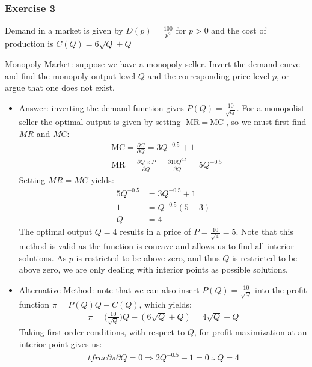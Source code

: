 \documentclass{article}
\begin{document}
\subsubsection{Exercise 3}
Demand in a market is given by $D(p) = \tfrac{100}{p^{2}}$ for $p > 0$ and the cost of production is $C(Q) = 6 \sqrt{Q} + Q$ \par \vspace{0.3em}
  \underline{Monopoly Market}: suppose we have a monopoly seller. Invert the demand curve and find the monopoly output level $Q$ and the corresponding price level $p$, or argue that one does not exist.
  \begin{itemize}
    \item  \underline{Answer}: inverting the demand function gives $P(Q) = \tfrac{10}{\sqrt{Q}}$. For a monopolist seller the optimal output is given by setting $\text{MR} \ = \ \text{MC}$, so we must first find $MR$ and $MC$:
    \begin{align*}
      &\text{MC} = \frac{\partial C}{\partial Q} = 3Q^{-0.5} + 1 \\
      &\text{MR} = \frac{\partial Q \times P}{\partial Q} = \frac{\partial 10Q^{0.5}}{\partial Q} = 5Q^{-0.5}
    \end{align*}
    Setting $MR = MC$ yields:
    \begin{align*}
      5Q^{-0.5} &= 3Q^{-0.5} + 1 \\
      1 &= Q^{-0.5}(5-3) \\
      Q &= 4
    \end{align*}
    The optimal output $Q = 4$ results in a price of $P = \tfrac{10}{\sqrt{4}} = 5$. Note that this method is valid as the function is concave and allows us to find all interior solutions. As $p$ is restricted to be above zero, and thus $Q$ is restricted to be above zero, we are only dealing with interior points as possible solutions.
    \item  \underline{Alternative Method}: note that we can also insert $P(Q) = \tfrac{10}{\sqrt{Q}}$ into the profit function $\pi = P(Q)Q - C(Q)$, which yields:
    \begin{gather*}
      \pi = \bigg(\frac{10}{\sqrt{Q}} \bigg)Q - (6\sqrt{Q} + Q) = 4\sqrt{Q} - Q
    \end{gather*}
    Taking first order conditions, with respect to $Q$, for profit maximization at an interior point gives us:
    \begin{gather*}
      tfrac{\partial \pi}{\partial Q} = 0 \Rightarrow 2Q^{-0.5} - 1 = 0 \ \therefore \ Q = 4
    \end{gather*}
  \end{itemize}
\end{document}
